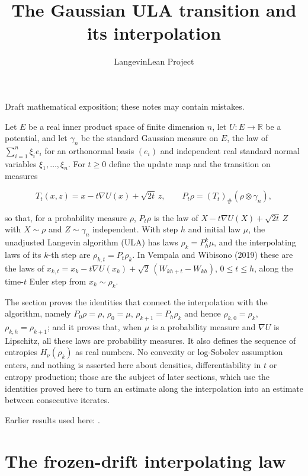 \documentclass[11pt,a4paper]{article}
\title{\texorpdfstring{The Gaussian ULA transition and its interpolation}{The Gaussian ULA transition and its interpolation}}
\author{LangevinLean Project}
\date{}
\begin{document}
\maketitle
Draft mathematical exposition; these notes may contain mistakes.


Let \(E\) be a real inner product space of finite dimension \(n\), let \(U:E\to\mathbb R\) be a potential, and let \(\gamma_n\) be the standard Gaussian measure on \(E\), the law of \(\sum_{i=1}^n\xi_ie_i\) for an orthonormal basis \((e_i)\) and independent real standard normal variables \(\xi_1,\dots,\xi_n\). For \(t\ge0\) define the update map and the transition on measures


\[T_t(x,z)=x-t\nabla U(x)+\sqrt{2t}\,z,\qquad P_t\rho=(T_t)_\#(\rho\otimes\gamma_n),\]


so that, for a probability measure \(\rho\), \(P_t\rho\) is the law of \(X-t\nabla U(X)+\sqrt{2t}\,Z\) with \(X\sim\rho\) and \(Z\sim\gamma_n\) independent. With step \(h\) and initial law \(\mu\), the unadjusted Langevin algorithm (ULA) has laws \(\rho_k=P_h^k\mu\), and the interpolating laws of its \(k\)-th step are \(\rho_{k,t}=P_t\rho_k\). In Vempala and Wibisono (2019) these are the laws of \(x_{k,t}=x_k-t\nabla U(x_k)+\sqrt2\,(W_{kh+t}-W_{kh})\), \(0\le t\le h\), along the time-\(t\) Euler step from \(x_k\sim\rho_k\).




The section proves the identities that connect the interpolation with the algorithm, namely \(P_0\rho=\rho\), \(\rho_0=\mu\), \(\rho_{k+1}=P_h\rho_k\) and hence \(\rho_{k,0}=\rho_k\), \(\rho_{k,h}=\rho_{k+1}\); and it proves that, when \(\mu\) is a probability measure and \(\nabla U\) is Lipschitz, all these laws are probability measures. It also defines the sequence of entropies \(H_\nu(\rho_k)\) as real numbers. No convexity or log-Sobolev assumption enters, and nothing is asserted here about densities, differentiability in \(t\) or entropy production; those are the subject of later sections, which use the identities proved here to turn an estimate along the interpolation into an estimate between consecutive iterates.



Earlier results used here: \cite[Section~3.36]{LangevinLean2026ULASC}.

\section{\texorpdfstring{The frozen-drift interpolating law}{The frozen-drift interpolating law}}
\end{document}

